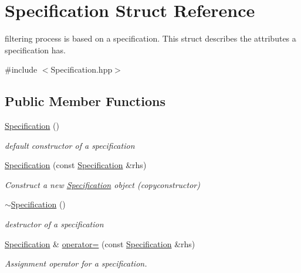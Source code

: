 \hypertarget{structSpecification}{}\section{Specification Struct Reference}
\label{structSpecification}


filtering process is based on a specification. This struct describes the attributes a specification has.  




{\ttfamily \#include $<$Specification.\+hpp$>$}

\subsection*{Public Member Functions}
\begin{DoxyCompactItemize}
\item 
\hyperlink{structSpecification_a1da67067067a6876811fe1af3dc09ef0}{Specification} ()\hypertarget{structSpecification_a1da67067067a6876811fe1af3dc09ef0}{}\label{structSpecification_a1da67067067a6876811fe1af3dc09ef0}

\begin{DoxyCompactList}\small\item\em default constructor of a specification \end{DoxyCompactList}\item 
\hyperlink{structSpecification_aa08664e5866421d776266b69c90138cb}{Specification} (const \hyperlink{structSpecification}{Specification} \&rhs)
\begin{DoxyCompactList}\small\item\em Construct a new \hyperlink{structSpecification}{Specification} object (copyconstructor) \end{DoxyCompactList}\item 
\hyperlink{structSpecification_a9e5dea83bffde839da128d4551a6a691}{$\sim$\+Specification} ()\hypertarget{structSpecification_a9e5dea83bffde839da128d4551a6a691}{}\label{structSpecification_a9e5dea83bffde839da128d4551a6a691}

\begin{DoxyCompactList}\small\item\em destructor of a specification \end{DoxyCompactList}\item 
\hyperlink{structSpecification}{Specification} \& \hyperlink{structSpecification_a63c2bfcc3247194eaaf72126de1888aa}{operator=} (const \hyperlink{structSpecification}{Specification} \&rhs)
\begin{DoxyCompactList}\small\item\em Assignment operator for a specification. \end{DoxyCompactList}\end{DoxyCompactItemize}
